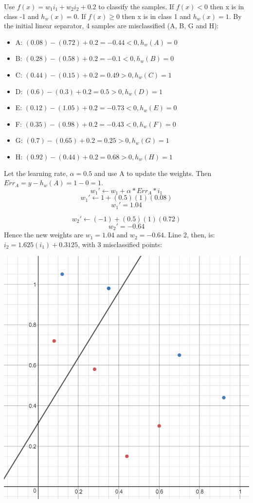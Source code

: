 \documentclass[12pt, letterpaper]{article}
\begin{document}
	Use $f(x) = w_1i_1+w_2i_2 + 0.2$ to classify the samples. If $f(x)<0$ then x is in class -1 and $h_w(x) = 0$. If $f(x) \geq 0$ then x is in class 1 and $h_w(x) = 1$. By the initial linear separator, 4 samples are misclassified (A, B, G and H):
	\begin{itemize}
		\item A: $(0.08) - (0.72) + 0.2 = -0.44 < 0, h_w(A) = 0$
		\item B: $(0.28) - (0.58) + 0.2 = -0.1 < 0, h_w(B) = 0$
		\item C: $(0.44) - (0.15) + 0.2 = 0.49 > 0, h_w(C) = 1$
		\item D: $(0.6) - (0.3) + 0.2 = 0.5 > 0, h_w(D) = 1$
		\item E: $(0.12) - (1.05) + 0.2 = -0.73 < 0, h_w(E) = 0$
		\item F: $(0.35) - (0.98) + 0.2 = -0.43 < 0, h_w(F) = 0$
		\item G: $(0.7) - (0.65) + 0.2 = 0.25 > 0, h_w(G) = 1$
		\item H: $(0.92) - (0.44) + 0.2 = 0.68 > 0, h_w(H) = 1$	
	\end{itemize} 	
	Let the learning rate, $\alpha = 0.5$ and use A to update the weights. Then $Err_A = y - h_w(A) = 1 - 0 = 1$.
	$$w_1' \leftarrow w_1 + \alpha * Err_A * i_1$$
	$$w_1' \leftarrow 1 + (0.5)(1)(0.08)$$
	$$w_1' = 1.04$$
	
	$$w_2' \leftarrow (-1) + (0.5)(1)(0.72)$$
	$$w_2' = -0.64$$
	Hence the new weights are $w_1 = 1.04$ and $w_2 = -0.64$. Line 2, then, is: $i_2 = 1.625(i_1) + 0.3125$, with 3 misclassified points:
	\medskip
	
	\includegraphics[scale=0.6]{"Problem 4/Line 2"}
	
\end{document}
